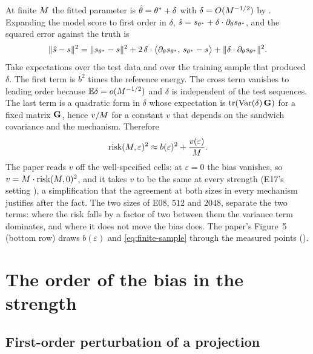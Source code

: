At finite $M$ the fitted parameter is $\hat{\theta}=\theta^\ast+\delta$ with
$\delta=O(M^{-1/2})$ by . Expanding the model score to first order
in $\delta$, $\hat s=s_{\theta^\ast}+\delta\cdot\partial_\theta s_{\theta^\ast}$, and
the squared error against the truth is
\begin{equation}
  \lVert\hat s-s\rVert^2=\lVert s_{\theta^\ast}-s\rVert^2
  +2\,\delta\cdot\bigl\langle\partial_\theta s_{\theta^\ast},\,s_{\theta^\ast}-s\bigr\rangle
  +\lVert\delta\cdot\partial_\theta s_{\theta^\ast}\rVert^2 .
\end{equation}
Take expectations over the test data and over the training sample that produced
$\delta$. The first term is $b^2$ times the reference energy. The cross term vanishes to
leading order because $\mathbb{E}\delta=o(M^{-1/2})$ and $\delta$ is independent of the test
sequences. The last term is a quadratic form in $\delta$ whose expectation is
$\operatorname{tr}(\operatorname{Var}(\delta)\,\mathbf{G})$ for a fixed matrix $\mathbf{G}$, hence $v/M$ for a constant
$v$ that depends on the sandwich covariance and the mechanism. Therefore
\begin{equation}
  \text{risk}(M,\varepsilon)^2\approx b(\varepsilon)^2+\frac{v(\varepsilon)}{M}.
  \label{eq:finite-sample}
\end{equation}
The paper reads $v$ off the well-specified cells: at $\varepsilon=0$ the bias vanishes,
so $v=M\cdot\text{risk}(M,0)^2$, and it takes $v$ to be the same at every
strength (E17's setting ), a simplification that the agreement at both
sizes in every mechanism justifies after the fact. The two sizes of E08, $512$ and $2048$,
separate the two terms: where the risk falls by a factor of two between them the
variance term dominates, and where it does not move the bias does. The paper's Figure~5
(bottom row) draws $b(\varepsilon)$ and \cref{eq:finite-sample} through the measured
points ().

\section{The order of the bias in the strength}
\label{sec:bias-order}

\subsection{First-order perturbation of a projection}

